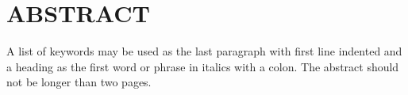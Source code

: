 \part{ABSTRACT}
\doublespacing

A list of keywords may be used as the last paragraph with first line indented and a heading as the first word or phrase in italics with a colon. The abstract should not be longer than two pages.

\setcounter{page}{2}